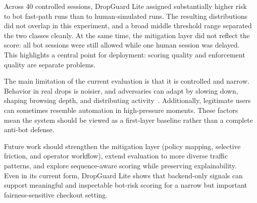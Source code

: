 \documentclass[12pt]{article}
\begin{document}
Across 40 controlled sessions, DropGuard Lite assigned substantially higher risk to bot fast-path runs than to human-simulated runs. The resulting distributions did not overlap in this experiment, and a broad middle threshold range separated the two classes cleanly. At the same time, the mitigation layer did not reflect the score: all bot sessions were still allowed while one human session was delayed. This highlights a central point for deployment: scoring quality and enforcement quality are separate problems.

The main limitation of the current evaluation is that it is controlled and narrow. Behavior in real drops is noisier, and adversaries can adapt by slowing down, shaping browsing depth, and distributing activity~\cite{10.1145/3538969.3538994}. Additionally, legitimate users can sometimes resemble automation in high-pressure moments. These factors mean the system should be viewed as a first-layer baseline rather than a complete anti-bot defense.

Future work should strengthen the mitigation layer (policy mapping, selective friction, and operator workflow), extend evaluation to more diverse traffic patterns, and explore sequence-aware scoring while preserving explainability. Even in its current form, DropGuard Lite shows that backend-only signals can support meaningful and inspectable bot-risk scoring for a narrow but important fairness-sensitive checkout setting.



\end{document}
